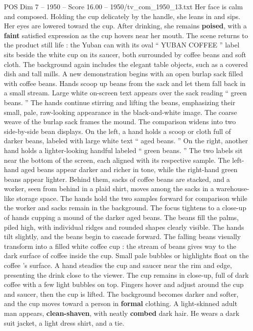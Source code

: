 \begin{textsample}{POS Dim 7 – 1950 – Score 16.00 – 1950/tv\_com\_1950\_13.txt}
Her face is calm and composed.
Holding the cup delicately by the handle, she leans in and sips.
Her eyes are lowered toward the cup.
After drinking, she remains \textbf{poised}, with a \textbf{faint} satisfied expression as the cup hovers near her mouth.
The scene returns to the product still life : the Yuban can with its oval “ YUBAN COFFEE ” label sits beside the white cup on its saucer, both surrounded by coffee beans and soft cloth.
The background again includes the elegant table objects, such as a covered dish and tall mills.
A new demonstration begins with an open burlap sack filled with coffee beans.
Hands scoop up beans from the sack and let them fall back in a small stream.
Large white on-screen text appears over the sack reading “ green beans. ” The hands continue stirring and lifting the beans, emphasizing their small, pale, raw-looking appearance in the black-and-white image.
The coarse weave of the burlap sack frames the mound.
The comparison widens into two side-by-side bean displays.
On the left, a hand holds a scoop or cloth full of darker beans, labeled with large white text “ aged beans. ” On the right, another hand holds a lighter-looking handful labeled “ green beans. ” The two labels sit near the bottom of the screen, each aligned with its respective sample.
The left-hand aged beans appear darker and richer in tone, while the right-hand green beans appear lighter.
Behind them, sacks of coffee beans are stacked, and a worker, seen from behind in a plaid shirt, moves among the sacks in a warehouse-like storage space.
The hands hold the two samples forward for comparison while the worker and sacks remain in the background.
The focus tightens to a close-up of hands cupping a mound of the darker aged beans.
The beans fill the palms, piled high, with individual ridges and rounded shapes clearly visible.
The hands tilt slightly, and the beans begin to cascade forward.
The falling beans visually transform into a filled white coffee cup : the stream of beans gives way to the dark surface of coffee inside the cup.
Small pale bubbles or highlights float on the coffee ’s surface.
A hand steadies the cup and saucer near the rim and edge, presenting the drink close to the viewer.
The cup remains in close-up, full of dark coffee with a few light bubbles on top.
Fingers hover and adjust around the cup and saucer, then the cup is lifted.
The background becomes darker and softer, and the cup moves toward a person in \textbf{formal} clothing.
A light-skinned adult man appears, \textbf{clean-shaven}, with neatly \textbf{combed} dark hair.
He wears a dark suit jacket, a light dress shirt, and a tie.

\end{textsample}
